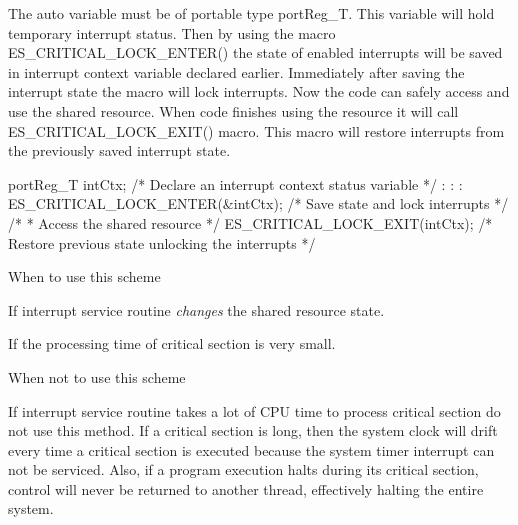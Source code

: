 The {\ttfamily auto} variable must be of portable type {\ttfamily port\-Reg\-\_\-\-T}. This variable will hold temporary interrupt status. Then by using the macro {\ttfamily E\-S\-\_\-\-C\-R\-I\-T\-I\-C\-A\-L\-\_\-\-L\-O\-C\-K\-\_\-\-E\-N\-T\-E\-R()} the state of enabled interrupts will be saved in interrupt context variable declared earlier. Immediately after saving the interrupt state the macro will lock interrupts. Now the code can safely access and use the shared resource. When code finishes using the resource it will call {\ttfamily E\-S\-\_\-\-C\-R\-I\-T\-I\-C\-A\-L\-\_\-\-L\-O\-C\-K\-\_\-\-E\-X\-I\-T()} macro. This macro will restore interrupts from the previously saved interrupt state.


\begin{DoxyCode}
portReg\_T intCtx;                   \textcolor{comment}{/* Declare an interrupt context status variable */}
    :
    :
    :
ES\_CRITICAL\_LOCK\_ENTER(&intCtx);    \textcolor{comment}{/* Save state and lock interrupts */}
\textcolor{comment}{/*}
\textcolor{comment}{ * Access the shared resource}
\textcolor{comment}{ */}
ES\_CRITICAL\_LOCK\_EXIT(intCtx);      \textcolor{comment}{/* Restore previous state unlocking the interrupts */}
\end{DoxyCode}
 \begin{DoxyParagraph}{When to use this scheme}

\begin{DoxyItemize}
\item If interrupt service routine {\itshape changes} the shared resource state.
\item If the processing time of critical section is very small.
\end{DoxyItemize}
\end{DoxyParagraph}
\begin{DoxyParagraph}{When not to use this scheme}

\begin{DoxyItemize}
\item If interrupt service routine takes a lot of C\-P\-U time to process critical section do not use this method. If a critical section is long, then the system clock will drift every time a critical section is executed because the system timer interrupt can not be serviced. Also, if a program execution halts during its critical section, control will never be returned to another thread, effectively halting the entire system.
\end{DoxyItemize}
\end{DoxyParagraph}
